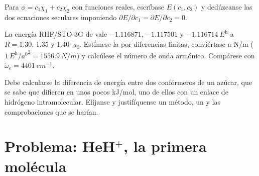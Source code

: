 \begin{exercise}[$\star\star\star$]\label{exo:b3:computational-chemistry:10}
Para $\phi = c_1\chi_1 + c_2\chi_2$ con funciones reales, escríbase $E(c_1,c_2)$ y
dedúzcanse las dos ecuaciones seculares imponiendo $\partial E/\partial c_1 =
\partial E/\partial c_2 = 0$.
\end{exercise}

\begin{exercise}[$\star\star\star$]\label{exo:b3:computational-chemistry:11}
La energía RHF/STO-3G de  vale $-1.116871$, $-1.117501$ y
$\qty{-1.116714}{\hartree}$ a $R = 1.30$, 1.35 y \qty{1.40}{\bohr}. Estímese
la  por diferencias finitas, conviértase a \unit{N/m}
($\qty{1}{\hartree\per\bohr\squared} = \qty{1556.9}{N/m}$) y calcúlese el
número de onda armónico. Compárese con $\tilde\omega_e = \qty{4401}{cm^{-1}}$.
\end{exercise}

\begin{exercise}[$\star\star\star$]\label{exo:b3:computational-chemistry:12}
Debe calcularse la diferencia de energía entre dos confórmeros de un azúcar,
que se sabe que difieren en unos pocos \unit{kJ/mol}, uno de ellos con un enlace de hidrógeno
intramolecular. Elíjanse y justifíquense un método, un  y las comprobaciones
que se harían.
\end{exercise}

\section{Problema: HeH\texorpdfstring{$^+$}{+}, la primera molécula}

